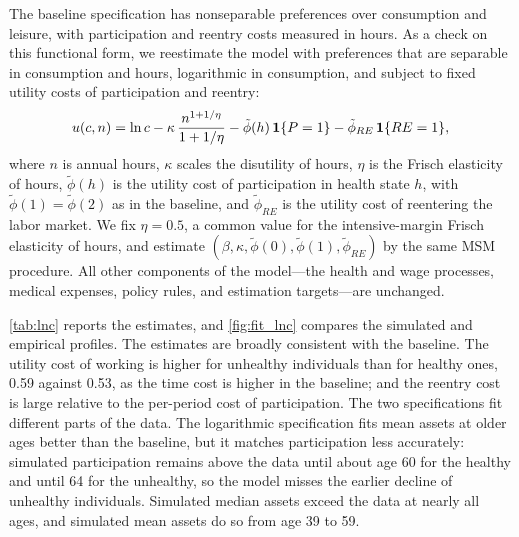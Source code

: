 The baseline specification has nonseparable preferences over consumption and leisure, with participation and reentry costs measured in hours. As a check on this functional form, we reestimate the model with preferences that are separable in consumption and hours, logarithmic in consumption, and subject to fixed utility costs of participation and reentry:
\[
u(c,n)=\ln c-\kappa\,\frac{n^{1+1/\eta}}{1+1/\eta}-\tilde{\phi}(h)\,\mathbf{1}\{P=1\}-\tilde{\phi}_{RE}\,\mathbf{1}\{RE=1\},
\]
where $n$ is annual hours, $\kappa$ scales the disutility of hours, $\eta$ is the Frisch elasticity of hours, $\tilde{\phi}(h)$ is the utility cost of participation in health state $h$, with $\tilde{\phi}(1)=\tilde{\phi}(2)$ as in the baseline, and $\tilde{\phi}_{RE}$ is the utility cost of reentering the labor market. We fix $\eta=0.5$, a common value for the intensive-margin Frisch elasticity of hours, and estimate $(\beta,\kappa,\tilde{\phi}(0),\tilde{\phi}(1),\tilde{\phi}_{RE})$ by the same MSM procedure. All other components of the model---the health and wage processes, medical expenses, policy rules, and estimation targets---are unchanged.

\autoref{tab:lnc} reports the estimates, and \autoref{fig:fit_lnc} compares the simulated and empirical profiles. The estimates are broadly consistent with the baseline. The utility cost of working is higher for unhealthy individuals than for healthy ones, 0.59 against 0.53, as the time cost is higher in the baseline; and the reentry cost is large relative to the per-period cost of participation. The two specifications fit different parts of the data. The logarithmic specification fits mean assets at older ages better than the baseline, but it matches participation less accurately: simulated participation remains above the data until about age 60 for the healthy and until 64 for the unhealthy, so the model misses the earlier decline of unhealthy individuals. Simulated median assets exceed the data at nearly all ages, and simulated mean assets do so from age 39 to 59. %


